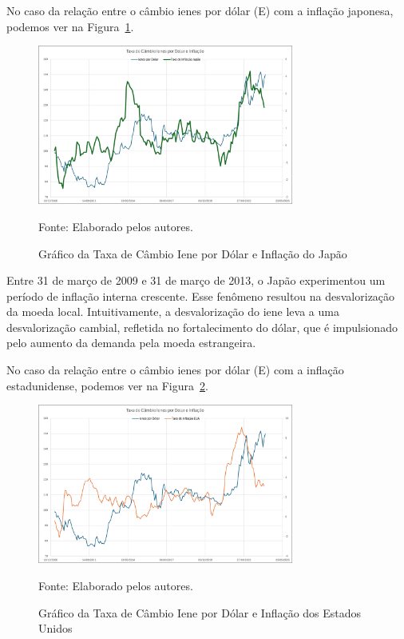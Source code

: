 \documentclass[a4paper,12pt]{article}[abntex2]
\begin{document}
No caso da relação entre o câmbio ienes por dólar (E) com a inflação japonesa, podemos ver na Figura~\ref{fig:cambioInflacaoJapao}.
 \begin{figure}[H]
    \centering
    \caption{Gráfico da Taxa de Câmbio Iene por Dólar e Inflação do Japão} 
    \includegraphics[width=0.75\textwidth]{Câmbio e Inflação japonesa.png}
    \label{fig:cambioInflacaoJapao}
    
    \footnotesize{Fonte: Elaborado pelos autores.}
    \end{figure}

Entre 31 de março de 2009 e 31 de março de 2013, o Japão experimentou um período de inflação interna crescente. Esse fenômeno resultou na desvalorização da moeda local. Intuitivamente, a desvalorização do iene leva a uma desvalorização cambial, refletida no fortalecimento do dólar, que é impulsionado pelo aumento da demanda pela moeda estrangeira. 

No caso da relação entre o câmbio ienes por dólar (E) com a inflação estadunidense, podemos ver na Figura~\ref{fig:cambioInflacaoEUA}.
 \begin{figure}[H]
    \centering
    \caption{Gráfico da Taxa de Câmbio Iene por Dólar e Inflação dos Estados Unidos} 
    \includegraphics[width=0.75\textwidth]{Câmbio e Inflação estadunidense.png}
    \label{fig:cambioInflacaoEUA}
    
    \footnotesize{Fonte: Elaborado pelos autores.}
    \end{figure}
\end{document}
